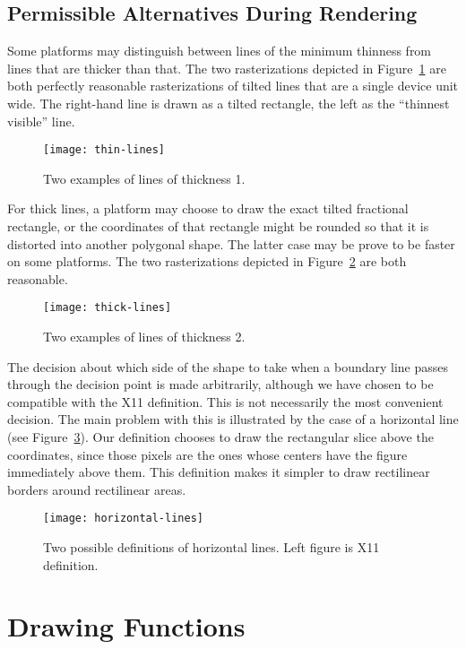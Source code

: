 \subsection {Permissible Alternatives During Rendering}

Some platforms may distinguish between lines of the minimum thinness from lines
that are thicker than that.  The two rasterizations depicted in
Figure~\ref{thin-lines} are both perfectly reasonable rasterizations of tilted
lines that are a single device unit wide.  The right-hand line is drawn as a
tilted rectangle, the left as the ``thinnest visible'' line.

\begin{figure}
\centerline{\texttt{[image: thin-lines]}}
\caption{\label{thin-lines} Two examples of lines of thickness 1.}
\end{figure}

For thick lines, a platform may choose to draw the exact tilted fractional
rectangle, or the coordinates of that rectangle might be rounded so that it is
distorted into another polygonal shape.  The latter case may be prove to be
faster on some platforms.  The two rasterizations depicted in
Figure~\ref{thick-lines} are both reasonable.

\begin{figure}
\centerline{\texttt{[image: thick-lines]}}
\caption{\label{thick-lines} Two examples of lines of thickness 2.}
\end{figure}

The decision about which side of the shape to take when a boundary line passes
through the decision point is made arbitrarily, although we have chosen to be
compatible with the X11 definition.  This is not necessarily the most convenient
decision.  The main problem with this is illustrated by the case of a horizontal
line (see Figure~\ref{horizontal-lines}).  Our definition chooses to draw the
rectangular slice above the coordinates, since those pixels are the ones whose
centers have the figure immediately above them.  This definition makes it
simpler to draw rectilinear borders around rectilinear areas.

\begin{figure}
\centerline{\texttt{[image: horizontal-lines]}}
\caption{\label{horizontal-lines} Two possible definitions of horizontal lines.
Left figure is X11 definition.}
\end{figure}


\section {Drawing Functions\label{drawing-functions}}

